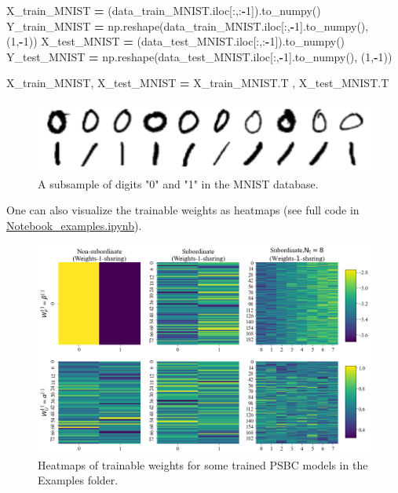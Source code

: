 \documentclass[openany,twoside]{book}
\newenvironment{Shaded}{\begin{snugshade}}{\end{snugshade}}
\newcommand{\DecValTok}[1]{\textcolor[rgb]{0.00,0.00,0.81}{#1}}
\newcommand{\NormalTok}[1]{#1}
\newcommand{\OperatorTok}[1]{\textcolor[rgb]{0.81,0.36,0.00}{\textbf{#1}}}
\begin{document}
\begin{Shaded}
\begin{Highlighting}[]
\NormalTok{X_train_MNIST }\OperatorTok{=}\NormalTok{ (data_train_MNIST.iloc[:,:}\OperatorTok{-}\DecValTok{1}\NormalTok{]).to_numpy()}
\NormalTok{Y_train_MNIST }\OperatorTok{=}\NormalTok{ np.reshape(data_train_MNIST.iloc[:,}\OperatorTok{-}\DecValTok{1}\NormalTok{].to_numpy(), (}\DecValTok{1}\NormalTok{,}\OperatorTok{-}\DecValTok{1}\NormalTok{))}
\NormalTok{X_test_MNIST }\OperatorTok{=}\NormalTok{ (data_test_MNIST.iloc[:,:}\OperatorTok{-}\DecValTok{1}\NormalTok{]).to_numpy()}
\NormalTok{Y_test_MNIST }\OperatorTok{=}\NormalTok{ np.reshape(data_test_MNIST.iloc[:,}\OperatorTok{-}\DecValTok{1}\NormalTok{].to_numpy(), (}\DecValTok{1}\NormalTok{,}\OperatorTok{-}\DecValTok{1}\NormalTok{))}

\NormalTok{X_train_MNIST, X_test_MNIST }\OperatorTok{=}\NormalTok{ X_train_MNIST.T , X_test_MNIST.T}
\end{Highlighting}
\end{Shaded}

\begin{figure}[htbp]
\centering
\includegraphics{figures/output_63_0.png}
\caption{A  subsample of digits "0" and "1" in the MNIST database.}
\end{figure}

One can also visualize the trainable weights as heatmaps (see full code in \href{https://github.com/rafael-a-monteiro-math/Binary_classification_phase_separation/blob/master/Notebook_PSBC_examples.ipynb}{Notebook\_examples.ipynb}).

\begin{figure}[htbp]
\centering
\includegraphics{figures/output_67_0.png}
\caption{Heatmaps of trainable weights for some trained PSBC models in the Examples folder.}
\end{figure}
\end{document}
